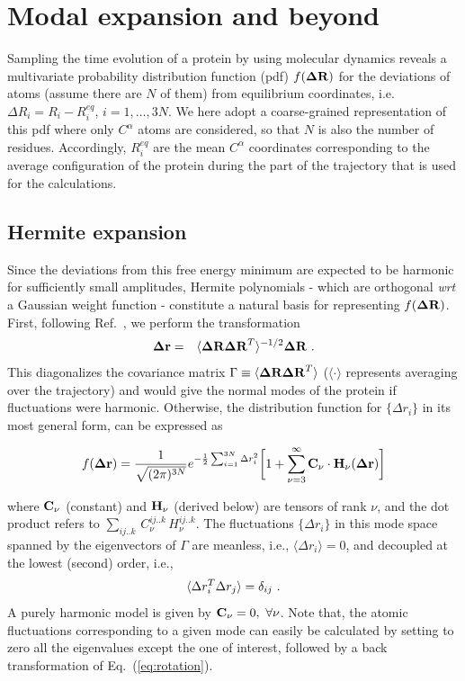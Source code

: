\documentclass[12pt,article]{iopart}
\begin{document}
\section{Modal expansion and beyond}
Sampling the time evolution of a protein by using molecular dynamics
reveals a multivariate probability distribution function (pdf) $f({\bf\Delta
R})$ for the deviations of atoms (assume there are $N$ of them) from
equilibrium coordinates, i.e. $\Delta R_i = R_i - R_i^{eq}$,
$i=1,\dots,3N$. We here adopt a coarse-grained representation of this
pdf where only $C^\alpha$ atoms are considered, so that $N$ is also the
number of residues. Accordingly, $R_i^{eq}$ are the mean $C^\alpha$
coordinates corresponding to the average configuration of the protein during
the part of the trajectory that is used for the calculations.

\subsection{Hermite expansion}
Since the deviations from this free energy minimum are expected to be
harmonic for sufficiently small amplitudes, Hermite polynomials -
which are orthogonal {\it wrt} a Gaussian weight function - constitute
a natural basis for representing $f({\bf\Delta R})$. First, following
Ref.~\cite{garcia1992large,yogurtcu2009statistical}, we perform the
transformation
\begin{eqnarray}
\label{eq:rotation}
{\bf \Delta r} &=& \langle {\bf\Delta R \Delta R}^T\rangle ^{-1/2} {\bf
  \Delta R}\ .
\end{eqnarray}
This diagonalizes the covariance matrix $ \Gamma\equiv\langle
{\bf\Delta R \Delta R}^T\rangle$ ($\langle \cdot\rangle$
represents averaging over the trajectory) and would give the normal
modes of the protein if fluctuations were harmonic. Otherwise, the
distribution function for $\{\Delta r_i\}$ in its most general form, can
be expressed as~\cite{flory1974moments}
\begin{small}
\begin{equation}
\label{hermite_expansion}
f({\bf\Delta r}) = \frac{1}{\sqrt{(2\pi)^{3N}}} e^{
    -\frac{1}{2}\sum_{i=1}^{3N} \Delta r_i^2} \bigg[ 1 +  \sum_{\nu=3}^\infty
 {\bf C_\nu}\cdot {\bf H}_\nu({\bf \Delta r}) \bigg]
\end{equation}
\end{small}

\noindent where ${\bf C}_\nu$ (constant) and ${\bf H}_\nu$ (derived
below) are tensors of rank $\nu$, and the dot product refers to
$\sum_{ij..k}\,C_\nu^{ij..k}\,H_\nu^{ij..k}$.  The fluctuations
$\{\Delta r_i\}$ in this mode space spanned by the eigenvectors of
$\Gamma$ are meanless, i.e., $\langle {\Delta r_i}\rangle = 0$, and
decoupled at the lowest (second) order, i.e.,
\begin{equation}
\langle {
\label{eqn:pair_corr}
  \Delta r_i^T \Delta r_j}\rangle = \delta_{ij}\ .
\end{equation}
A purely harmonic model is given by ${\bf C}_\nu = 0,\ \forall
\nu$. Note that, the atomic fluctuations
corresponding to a given mode can easily be calculated by setting to
zero all the eigenvalues except the one of interest, followed by a
back transformation of Eq.~(\ref{eq:rotation}).
\end{document}
